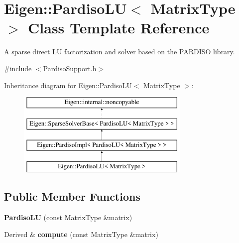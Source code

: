 \hypertarget{class_eigen_1_1_pardiso_l_u}{}\section{Eigen\+::Pardiso\+LU$<$ Matrix\+Type $>$ Class Template Reference}
\label{class_eigen_1_1_pardiso_l_u}


A sparse direct LU factorization and solver based on the P\+A\+R\+D\+I\+SO library.  




{\ttfamily \#include $<$Pardiso\+Support.\+h$>$}

Inheritance diagram for Eigen\+::Pardiso\+LU$<$ Matrix\+Type $>$\+:\begin{figure}[H]
\begin{center}
\leavevmode
\includegraphics[height=4.000000cm]{class_eigen_1_1_pardiso_l_u}
\end{center}
\end{figure}
\subsection*{Public Member Functions}
\begin{DoxyCompactItemize}
\item 
\mbox{\label{class_eigen_1_1_pardiso_l_u_aa4c9aeab1443d5f1923eaffb360fa5ef}} 
{\bfseries Pardiso\+LU} (const Matrix\+Type \&matrix)
\item 
\mbox{\label{class_eigen_1_1_pardiso_l_u_a01d51b4c6a2aa4d269f77d9f12ab8c34}} 
Derived \& {\bfseries compute} (const Matrix\+Type \&matrix)
\end{DoxyCompactItemize}
